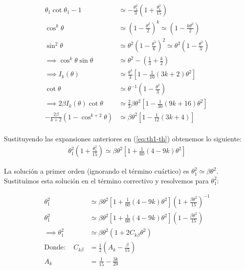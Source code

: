 \begin{align}
  \theta_1\cot\theta_1 -1 &\simeq -\frac{\theta^2_1}{3}\left(1 + \frac{\theta^2_1}{15}\right) \\
  \cos^k\theta &\simeq \left(1 - \frac{\theta^2}{2}\right)^k \simeq \left(1 - \frac{k\theta^2}{2}\right) \\
  \sin^2\theta &\simeq \theta^2\left(1 - \frac{\theta^2}{6}\right)^2 \simeq \theta^2\left(1 - \frac{\theta^2}{3}\right)\\
  \implies \cos^k\theta\sin\theta &\simeq \theta^2 - \left(\frac{1}{3} + \frac{k}{2}\right) \\
  \implies I_k(\theta) &\simeq \frac{\theta^3}{3}\left[1 - \frac{1}{10}\left(3k + 2\right)\theta^2\right] \\
  \cot\theta &\simeq \theta^{-1}\left(1 - \frac{\theta^2}{3}\right) \\
  \implies 2\beta I_k(\theta)\cot\theta &\simeq \frac{2}{3}\beta\theta^2\left[1 - \frac{1}{30}\left(9k + 16\right)\theta^2\right] \\
  -\frac{2\beta}{k+2}\left(1 - \cos^{k+2}\theta\right) &\simeq \beta\theta^2\left[1 - \frac{1}{12}\left(3k+4\right)\right] \\
\end{align}

Sustituyendo las expansiones anteriores en (\ref{eq:th1-th}) obtenemos lo siguiente:
\begin{align}
  \theta^2_1\left(1 + \frac{\theta^2_1}{15}\right) \simeq \beta\theta^2\left[1 + \frac{1}{60}\left(4 - 9k\right)\theta^2\right]
  \label{eq:th1-th-approx}
\end{align}

La solución a primer orden (ignorando el término cuártico) es $\theta^2_ 1 \simeq \beta\theta^2$. Sustituímos esta solución en el
término correctivo y resolvemos para $\theta^2_1$:

\begin{align}
  \theta^2_1 &\simeq \beta\theta^2\left[1 + \frac{1}{60}\left(4 - 9k\right)\theta^2\right]\left(1 + \frac{\beta\theta^2}{15}\right)^{-1} \\
  \theta^2_1 &\simeq \beta\theta^2\left[1 + \frac{1}{60}\left(4 - 9k\right)\theta^2\right]\left(1 - \frac{\beta\theta^2}{15}\right) \\
  \implies \theta^2_1 &\simeq \beta\theta^2\left(1 + 2C_{k\beta}\theta^2\right) \\
  \mathrm{Donde:\quad}C_{k\beta} &= \frac{1}{2}\left(A_k - \frac{\beta}{15}\right) \\
  A_k &= \frac{1}{15} - \frac{3k}{20}
\end{align}

